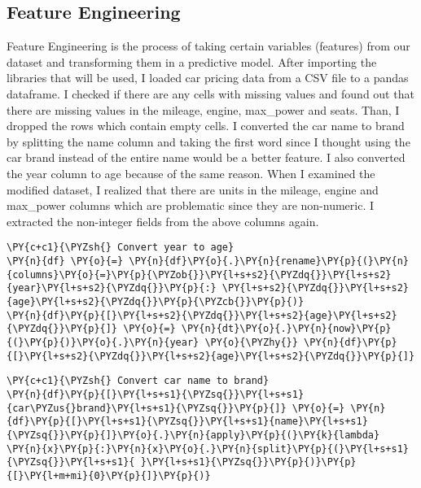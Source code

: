 \subsection*{Feature Engineering}
Feature Engineering is the process of taking certain variables (features) from
our dataset and transforming them in a predictive model.  After importing the
libraries that will be used, I loaded car pricing data from a CSV file to a
pandas dataframe. I checked if there are any cells with missing values and found
out that there are missing values in the mileage, engine, max\_power and seats.
Than, I dropped the rows which contain empty cells. I converted the car name to
brand by splitting the name column and taking the first word since I thought
using the car brand instead of the entire name would be a better feature. I also
converted the year column to age because of the same reason. When I examined the
modified dataset, I realized that there are units in the mileage, engine and
max\_power columns which are problematic since they are non-numeric. I extracted
the non-integer fields from the above columns again.

\begin{tcolorbox}[breakable, size=fbox, boxrule=1pt, pad at break*=1mm,colback=cellbackground, colframe=cellborder]
\begin{Verbatim}[commandchars=\\\{\}]
\PY{c+c1}{\PYZsh{} Convert year to age}
\PY{n}{df} \PY{o}{=} \PY{n}{df}\PY{o}{.}\PY{n}{rename}\PY{p}{(}\PY{n}{columns}\PY{o}{=}\PY{p}{\PYZob{}}\PY{l+s+s2}{\PYZdq{}}\PY{l+s+s2}{year}\PY{l+s+s2}{\PYZdq{}}\PY{p}{:} \PY{l+s+s2}{\PYZdq{}}\PY{l+s+s2}{age}\PY{l+s+s2}{\PYZdq{}}\PY{p}{\PYZcb{}}\PY{p}{)}
\PY{n}{df}\PY{p}{[}\PY{l+s+s2}{\PYZdq{}}\PY{l+s+s2}{age}\PY{l+s+s2}{\PYZdq{}}\PY{p}{]} \PY{o}{=} \PY{n}{dt}\PY{o}{.}\PY{n}{now}\PY{p}{(}\PY{p}{)}\PY{o}{.}\PY{n}{year} \PY{o}{\PYZhy{}} \PY{n}{df}\PY{p}{[}\PY{l+s+s2}{\PYZdq{}}\PY{l+s+s2}{age}\PY{l+s+s2}{\PYZdq{}}\PY{p}{]}
\end{Verbatim}
\end{tcolorbox}

\begin{tcolorbox}[breakable, size=fbox, boxrule=1pt, pad at break*=1mm,colback=cellbackground, colframe=cellborder]
\begin{Verbatim}[commandchars=\\\{\}]
\PY{c+c1}{\PYZsh{} Convert car name to brand}
\PY{n}{df}\PY{p}{[}\PY{l+s+s1}{\PYZsq{}}\PY{l+s+s1}{car\PYZus{}brand}\PY{l+s+s1}{\PYZsq{}}\PY{p}{]} \PY{o}{=} \PY{n}{df}\PY{p}{[}\PY{l+s+s1}{\PYZsq{}}\PY{l+s+s1}{name}\PY{l+s+s1}{\PYZsq{}}\PY{p}{]}\PY{o}{.}\PY{n}{apply}\PY{p}{(}\PY{k}{lambda} \PY{n}{x}\PY{p}{:}\PY{n}{x}\PY{o}{.}\PY{n}{split}\PY{p}{(}\PY{l+s+s1}{\PYZsq{}}\PY{l+s+s1}{ }\PY{l+s+s1}{\PYZsq{}}\PY{p}{)}\PY{p}{[}\PY{l+m+mi}{0}\PY{p}{]}\PY{p}{)}
\end{Verbatim}
\end{tcolorbox}


